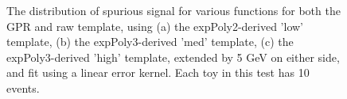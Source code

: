 \begin{figure} 
\begin{center}

\caption{The distribution of spurious signal for various functions for both the GPR and raw template, using (a) the expPoly2-derived 'low' template, (b) the expPoly3-derived 'med' template, (c) the expPoly3-derived 'high' template, extended by 5 GeV on either side, and fit using a linear error kernel. Each toy in this test has 10 events.}
\label{fig:linearkernel_lowpt_10_noSig}
\end{center}
\end{figure}


